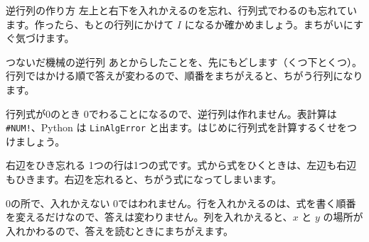 \begin{tsumazuki}{逆行列の作り方}
左上と右下を入れかえるのを忘れ、行列式でわるのも忘れています。作ったら、もとの行列にかけて $I$ になるか確かめましょう。まちがいにすぐ気づけます。
\end{tsumazuki}

\begin{tsumazuki}{つないだ機械の逆行列}
あとからしたことを、先にもどします（くつ下とくつ）。行列ではかける順で答えが変わるので、順番をまちがえると、ちがう行列になります。
\end{tsumazuki}

\begin{tsumazuki}{行列式が0のとき}
0でわることになるので、逆行列は作れません。表計算は \texttt{\#NUM!}、Python は \texttt{LinAlgError} と出ます。はじめに行列式を計算するくせをつけましょう。
\end{tsumazuki}

\begin{tsumazuki}{右辺をひき忘れる}
1つの行は1つの式です。式から式をひくときは、左辺も右辺もひきます。右辺を忘れると、ちがう式になってしまいます。
\end{tsumazuki}
\begin{tsumazuki}{0の所で、入れかえない}
0ではわれません。行を入れかえるのは、式を書く順番を変えるだけなので、答えは変わりません。列を入れかえると、$x$ と $y$ の場所が入れかわるので、答えを読むときにまちがえます。
\end{tsumazuki}

